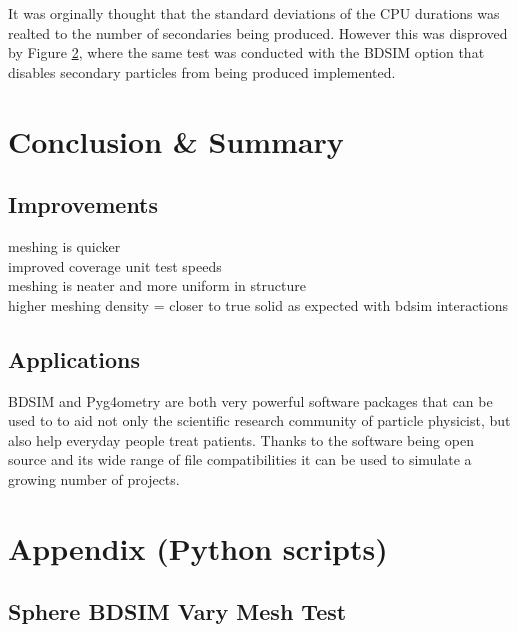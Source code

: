 \documentclass[12pt,a4paper]{article}
\begin{document}
\noindent It was orginally thought that the standard deviations of the CPU durations was realted to the number of secondaries being produced. However this was disproved by Figure \ref{}, where the same test was conducted with the BDSIM option that disables secondary particles from being produced implemented.
\newpage
\section{Conclusion \& Summary}
\label{conc}

\subsection{Improvements}
meshing is quicker\\
improved coverage unit test speeds\\
meshing is neater and more uniform in structure\\
higher meshing density = closer to true solid as expected with bdsim interactions\\

\subsection{Applications}
BDSIM and Pyg4ometry are both very powerful software packages that can be used to to aid not only the scientific research community of particle physicist, but also help everyday people treat patients. Thanks to the software being open source and its wide range of file compatibilities it can be used to simulate a growing number of projects.



\newpage
\appendix

\section{Appendix (Python scripts)}
\subsection{Sphere BDSIM Vary Mesh Test}\label{ap1}


%
\end{document}
